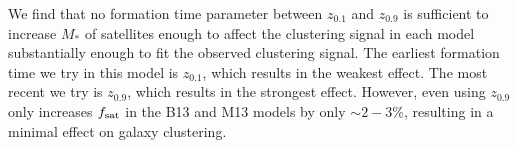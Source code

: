 \documentclass[a4paper,fleqn,usenatbib]{mnras}
\begin{document}
We find that no formation time parameter between $z_{0.1}$ and $z_{0.9}$ is sufficient to increase $M_*$ of satellites enough to affect the clustering signal in each model substantially enough to fit the observed clustering signal. The earliest formation time we try in this model is $z_{0.1}$, which results in the weakest effect.  The most recent we try is $z_{0.9}$, which results in the strongest effect. However, even using $z_{0.9}$ only increases $f_{\rm sat}$ in the B13 and M13 models by only $\sim 2-3\%$, resulting in a minimal effect on galaxy clustering.
      




\end{document}

